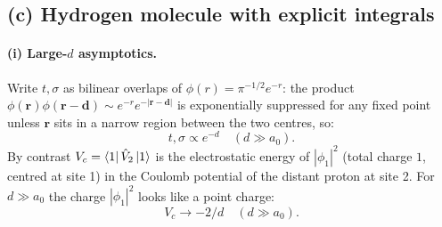 \documentclass[11pt]{article}
\renewcommand{\vb}[1]{\mathbf{#1}}
\begin{document}
\subsection*{(c) Hydrogen molecule with explicit integrals}

\paragraph{(i) Large-$d$ asymptotics.} Write $t,\sigma$ as bilinear overlaps of $\phi(r)=\pi^{-1/2}e^{-r}$: the product $\phi(\vb r)\phi(\vb r-\vb d)\sim e^{-r}e^{-|\vb r-\vb d|}$ is exponentially suppressed for any fixed point unless $\vb r$ sits in a narrow region between the two centres, so:
\begin{equation}
t,\sigma\propto e^{-d}\quad(d\gg a_0).
\end{equation}
By contrast $V_c=\bra1\hat V_2\ket1$ is the electrostatic energy of $|\phi_1|^2$ (total charge $1$, centred at site 1) in the Coulomb potential of the distant proton at site 2. For $d\gg a_0$ the charge $|\phi_1|^2$ looks like a point charge:
\begin{equation}
V_c\to -2/d\quad(d\gg a_0).
\end{equation}
\end{document}
